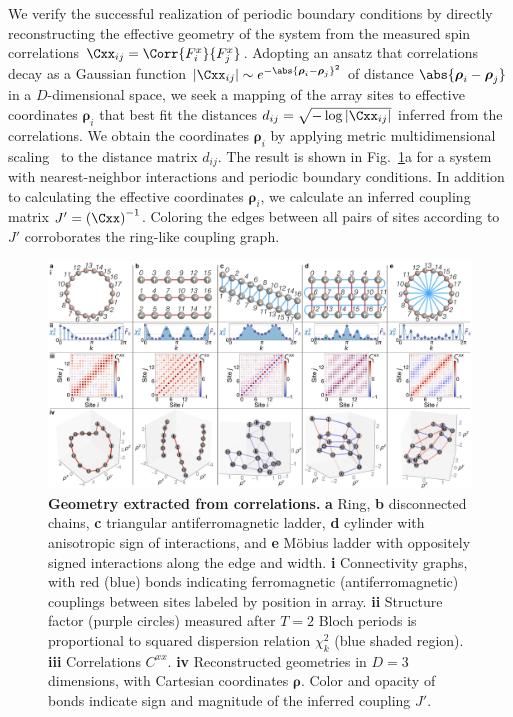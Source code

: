 \documentclass[aps,pra,superscriptaddress,12pt]{revtex4-1} %
\begin{document}
\begin{bibunit}
We verify the successful realization of periodic boundary conditions by directly reconstructing the effective geometry of the system from the measured spin correlations $\Cxx_{ij} = \Corr{F^x_i}{F^x_j}$.  Adopting an ansatz that correlations decay as a Gaussian function $\left|\Cxx_{ij}\right|\sim e^{-\abs{\boldsymbol{\rho}_i-\boldsymbol{\rho}_j}^2}$ of distance $\abs{\boldsymbol{\rho}_i-\boldsymbol{\rho}_j}$ in a $D$-dimensional space, we seek a mapping of the array sites to effective coordinates $\boldsymbol{\rho}_i$ that best fit the distances $d_{ij} = \sqrt{-\log |\Cxx_{ij}|}$ inferred from the correlations.  We obtain the coordinates $\boldsymbol{\rho}_i$ by applying metric multidimensional scaling~\cite{torgerson1952multidimensional} to the distance matrix $d_{ij}$.  The result is shown in Fig.~\ref{fig:geometry}a for a system with nearest-neighbor interactions and periodic boundary conditions. In addition to calculating the effective coordinates $\boldsymbol{\rho}_i$, we calculate an inferred coupling matrix $J' = \left(\Cxx\right)^{-1}$.  Coloring the edges between all pairs of sites according to $J'$ corroborates the ring-like coupling graph.

\begin{figure}[tb]
\includegraphics[width=\textwidth]{Figures/Figure3.pdf}
\caption{\textbf{Geometry extracted from correlations.} 
\textbf{a} Ring, \textbf{b} disconnected chains, \textbf{c} triangular antiferromagnetic ladder, \textbf{d} cylinder with anisotropic sign of interactions, and \textbf{e} M\"obius ladder with oppositely signed interactions along the edge and width.  \textbf{i} Connectivity graphs, with red (blue) bonds indicating ferromagnetic (antiferromagnetic) couplings between sites labeled by position in array.  \textbf{ii} Structure factor (purple circles) measured after $T=2$ Bloch periods is proportional to squared dispersion relation $\chi_{k}^2$ (blue shaded region).  \textbf{iii} Correlations $C^{xx}$.  \textbf{iv} Reconstructed geometries in $D = 3$ dimensions, with Cartesian coordinates $\boldsymbol{\rho}$.  Color and opacity of bonds indicate sign and magnitude of the inferred coupling $J'$.}
\label{fig:geometry}
\end{figure}


\end{bibunit}
\end{document}
